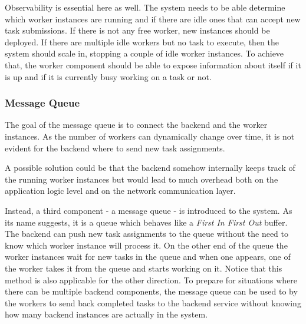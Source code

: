 Observability is essential here as well. The system needs to be able determine which worker instances are running and if there are idle ones that can accept new task submissions. If there is not any free worker, new instances should be deployed. If there are multiple idle workers but no task to execute, then the system should scale in, stopping a couple of idle worker instances. To achieve that, the worker component should be able to expose information about itself if it is up and if it is currently busy working on a task or not.


\subsubsection{Message Queue} \label{design-message-queue}


The goal of the message queue is to connect the backend and the worker instances. As the number of workers can dynamically change over time, it is not evident for the backend where to send new task assignments.

A possible solution could be that the backend somehow internally keeps track of the running worker instances but would lead to much overhead both on the application logic level and on the network communication layer.

Instead, a third component - a message queue - is introduced to the system. As its name suggests, it is a queue which behaves like a \emph{First In First Out} buffer. The backend can push new task assignments to the queue without the need to know which worker instance will process it. On the other end of the queue the worker instances wait for new tasks in the queue and when one appears, one of the worker takes it from the queue and starts working on it. Notice that this method is also applicable for the other direction. To prepare for situations where there can be multiple backend components, the message queue can be used to by the workers to send back completed tasks to the backend service without knowing how many backend instances are actually in the system.

